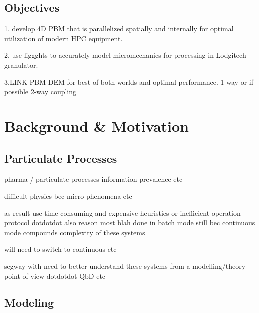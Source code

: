 \documentclass[preprint,11pt,authoryear]{elsarticle}
\begin{document}
	    \subsection{Objectives}
	    \par 1. develop 4D PBM that is parallelized spatially and internally for optimal utilization of modern HPC equipment.
	    \par 2. use liggghts to accurately model micromechanics for processing in Lodgitech granulator. 
	    \par 3.LINK PBM-DEM for best of both worlds and optimal performance.  1-way or if possible 2-way coupling
	
		
	\section{Background \& Motivation}
	
	  \subsection{Particulate Processes}
  \par pharma / particulate processes information prevalence etc
  \par difficult physics bec micro phenomena etc 
  \par as result use time consuming and expensive heuristics or inefficient operation protocol  dotdotdot also reason most blah done in batch mode still bec continuous mode compounds complexity of these systems \par will need to switch to continuous etc  
  \par segway with need to better understand these systems from a modelling/theory point of view dotdotdot QbD etc 
	  
	  \subsection{Modeling}
\end{document}
